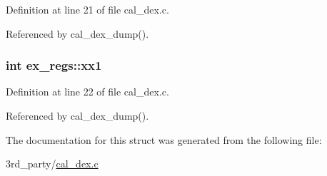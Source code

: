 Definition at line 21 of file cal\+\_\+dex.\+c.



Referenced by cal\+\_\+dex\+\_\+dump().

\subsubsection[{\texorpdfstring{xx1}{xx1}}]{\setlength{\rightskip}{0pt plus 5cm}int ex\+\_\+regs\+::xx1}\hypertarget{structex__regs_a12379b0b3152b878eebc8f18a6efeaf0}{}\label{structex__regs_a12379b0b3152b878eebc8f18a6efeaf0}


Definition at line 22 of file cal\+\_\+dex.\+c.



Referenced by cal\+\_\+dex\+\_\+dump().



The documentation for this struct was generated from the following file\+:\begin{DoxyCompactItemize}
\item 
3rd\+\_\+party/\hyperlink{cal__dex_8c}{cal\+\_\+dex.\+c}\end{DoxyCompactItemize}
